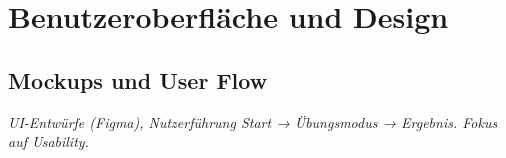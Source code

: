\section{Benutzeroberfläche und Design}

\subsection{Mockups und User Flow}
\textit{UI-Entwürfe (Figma), Nutzerführung Start → Übungsmodus → Ergebnis. Fokus auf Usability.}